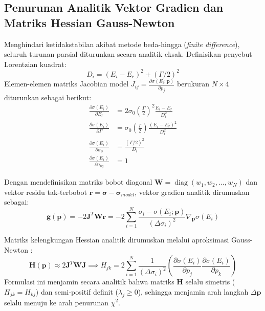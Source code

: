 \subsection*{Penurunan Analitik Vektor Gradien dan Matriks Hessian Gauss-Newton}
Menghindari ketidakstabilan akibat metode beda-hingga (\textit{finite difference}), seluruh turunan parsial diturunkan secara analitik eksak. Definisikan penyebut Lorentzian kuadrat:
\begin{equation}
    D_i = (E_i - E_r)^2 + (\Gamma / 2)^2
    \label{eq:denom_lorentz}
\end{equation}
Elemen-elemen matriks Jacobian model $J_{ij} = \frac{\partial \sigma(E_i; \mathbf{p})}{\partial p_j}$ berukuran $N \times 4$ diturunkan sebagai berikut:
\begin{align}
    \frac{\partial \sigma(E_i)}{\partial E_r} &= 2 \sigma_0 \left(\frac{\Gamma}{2}\right)^2 \frac{E_i - E_r}{D_i^2} \label{eq:d_Er} \\
    \frac{\partial \sigma(E_i)}{\partial \Gamma} &= \sigma_0 \left(\frac{\Gamma}{2}\right) \frac{(E_i - E_r)^2}{D_i^2} \label{eq:d_Gamma} \\
    \frac{\partial \sigma(E_i)}{\partial \sigma_0} &= \frac{(\Gamma / 2)^2}{D_i} \label{eq:d_sigma0} \\
    \frac{\partial \sigma(E_i)}{\partial \sigma_{bg}} &= 1 \label{eq:d_sigmabg}
\end{align}

Dengan mendefinisikan matriks bobot diagonal $\mathbf{W} = \operatorname{diag}(w_1, w_2, \dots, w_N)$ dan vektor residu tak-terbobot $\mathbf{r} = \boldsymbol{\sigma} - \boldsymbol{\sigma}_{model}$, vektor gradien analitik dirumuskan sebagai:
\begin{equation}
    \mathbf{g}(\mathbf{p}) = -2 \mathbf{J}^T \mathbf{W} \mathbf{r} = -2 \sum_{i=1}^N \frac{\sigma_i - \sigma(E_i; \mathbf{p})}{(\Delta\sigma_i)^2} \nabla_{\mathbf{p}} \sigma(E_i)
    \label{eq:gradient_matrix}
\end{equation}

Matriks kelengkungan Hessian analitik dirumuskan melalui aproksimasi Gauss-Newton \parencite{press2007numerical}:
\begin{equation}
    \mathbf{H}(\mathbf{p}) \approx 2 \mathbf{J}^T \mathbf{W} \mathbf{J} \implies H_{jk} = 2 \sum_{i=1}^N \frac{1}{(\Delta\sigma_i)^2} \left( \frac{\partial \sigma(E_i)}{\partial p_j} \frac{\partial \sigma(E_i)}{\partial p_k} \right)
    \label{eq:hessian_gauss_newton}
\end{equation}
Formulasi ini menjamin secara analitik bahwa matriks $\mathbf{H}$ selalu simetris ($H_{jk} = H_{kj}$) dan semi-positif definit ($\lambda_j \ge 0$), sehingga menjamin arah langkah $\Delta\mathbf{p}$ selalu menuju ke arah penurunan $\chi^2$.

